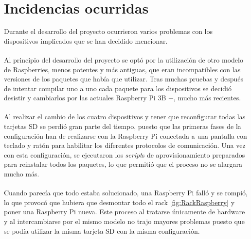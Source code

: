 \section{Incidencias ocurridas}
Durante el desarrollo del proyecto ocurrieron varios problemas con los dispositivos implicados que se han decidido mencionar. 
\\ \\
Al principio del desarrollo del proyecto se optó por la utilización de otro modelo de Raspberries, menos potentes y más antiguas, que eran incompatibles con las versiones de los paquetes que había que utilizar. Tras muchas pruebas y después de intentar compilar uno a uno cada paquete para los dispositivos se decidió desistir y cambiarlos por las actuales Raspberry Pi 3B +, mucho más recientes.
\\ \\
Al realizar el cambio de los cuatro dispositivos y tener que reconfigurar todas las tarjetas SD se perdió gran parte del tiempo, puesto que las primeras fases de la configuración han de realizarse con la Raspberry Pi conectada a una pantalla con teclado y ratón para habilitar los diferentes protocolos de comunicación. Una vez con esta configuración, se ejecutaron los \textit{script}s de aprovisionamiento preparados para reinstalar todos los paquetes, lo que permitió que el proceso no se alargara mucho más. 
\\ \\
Cuando parecía que todo estaba solucionado, una Raspberry Pi falló y se rompió, lo que provocó que hubiera que desmontar todo el rack \ref{fig:RackRaspberry} y poner una Raspberry Pi nueva. Este proceso al tratarse únicamente de hardware y al intercambiarse por el mismo modelo no trajo mayores problemas puesto que se podía utilizar la misma tarjeta SD con la misma configuración.
